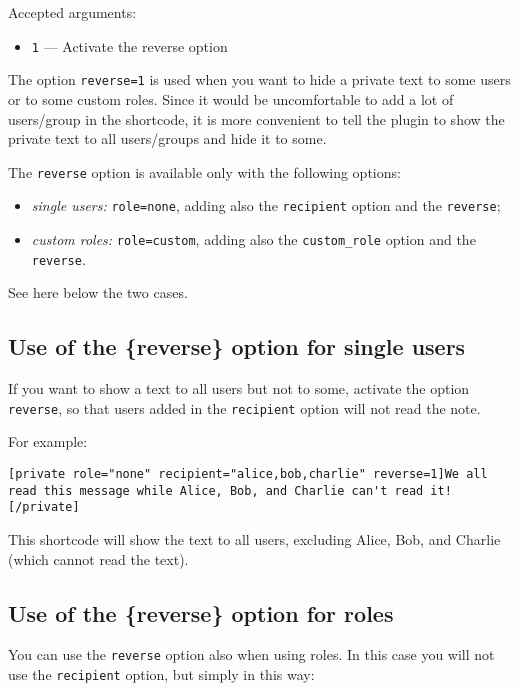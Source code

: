 Accepted arguments:

\begin{itemize}
 \item \verb+1+ --- Activate the reverse option
\end{itemize}

The option \verb+reverse=1+ is used when you want to hide a private text to some
users or to some custom roles. Since it would be uncomfortable to add a lot of
users/group in the shortcode, it is more convenient to tell the plugin to show
the private text to all users/groups and hide it to some.

The \verb+reverse+ option is available only with the following options:

\begin{itemize}
 \item \textit{single users:} \verb+role=none+, adding also the \verb+recipient+ option
 and the \verb+reverse+;
 \item \textit{custom roles:} \verb+role=custom+, adding also the \verb+custom_role+
 option and the \verb+reverse+.
\end{itemize}

See here below the two cases.

\subsection{Use of the \{reverse\} option for single users}

If you want to show a text to all users but not to some, activate the option
\verb+reverse+, so that users added in the \verb+recipient+ option will not read
the note.

For example:

\begin{lstlisting}
[private role="none" recipient="alice,bob,charlie" reverse=1]We all read this message while Alice, Bob, and Charlie can't read it![/private]
\end{lstlisting}

This shortcode will show the text to all users, excluding Alice, Bob, and
Charlie (which cannot read the text).

\subsection{Use of the \{reverse\} option for roles}

You can use the \verb+reverse+ option also when using roles. In this case you
will not use the \verb+recipient+ option, but simply in this way:

